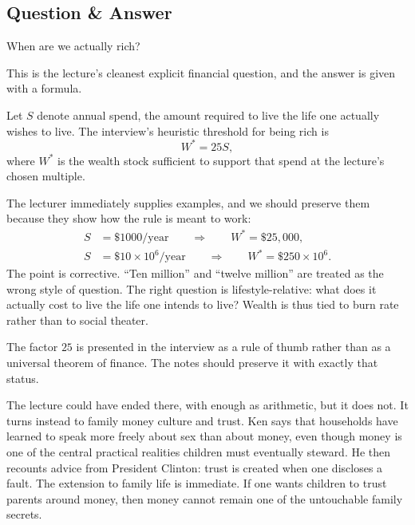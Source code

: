 \subsection{Question \& Answer}

When are we actually rich?

This is the lecture's cleanest explicit financial question, and the answer is given with a formula.

\begin{definition}
Let \(S\) denote annual spend, the amount required to live the life one actually wishes to live. The interview's heuristic threshold for being rich is
\begin{equation}
W^\ast = 25S,
\end{equation}
where \(W^\ast\) is the wealth stock sufficient to support that spend at the lecture's chosen multiple.
\end{definition}

The lecturer immediately supplies examples, and we should preserve them because they show how the rule is meant to work:
\begin{align}
S &= \$1000/\text{year}
\qquad \Longrightarrow \qquad
W^\ast = \$25{,}000,\\
S &= \$10 \times 10^6/\text{year}
\qquad \Longrightarrow \qquad
W^\ast = \$250 \times 10^6.
\end{align}
The point is corrective. ``Ten million'' and ``twelve million'' are treated as the wrong style of question. The right question is lifestyle-relative: what does it actually cost to live the life one intends to live? Wealth is thus tied to burn rate rather than to social theater.

\begin{remark}
The factor \(25\) is presented in the interview as a rule of thumb rather than as a universal theorem of finance. The notes should preserve it with exactly that status.
\end{remark}

The lecture could have ended there, with enough as arithmetic, but it does not. It turns instead to family money culture and trust. Ken says that households have learned to speak more freely about sex than about money, even though money is one of the central practical realities children must eventually steward. He then recounts advice from President Clinton: trust is created when one discloses a fault. The extension to family life is immediate. If one wants children to trust parents around money, then money cannot remain one of the untouchable family secrets.

